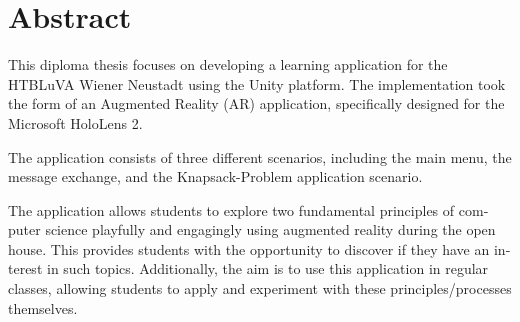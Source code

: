 \chapter{Abstract}

\begin{english} %
This diploma thesis focuses on developing a learning application for the HTBLuVA Wiener Neustadt using the Unity platform.
The implementation took the form of an Augmented Reality (AR) application, specifically designed for the Microsoft HoloLens 2.

The application consists of three different scenarios, including the main menu, the message exchange, and the
Knapsack-Problem application scenario.

The application allows students to explore two fundamental principles of computer science playfully and engagingly
using augmented reality during the open house. This provides students with the opportunity to discover if they have
an interest in such topics. Additionally, the aim is to use this application in regular classes, allowing students
to apply and experiment with these principles/processes themselves.
\end{english}


